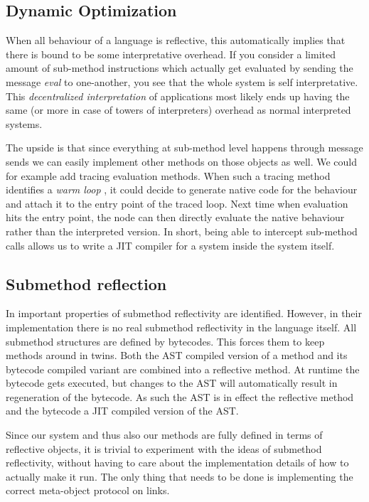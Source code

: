 \documentclass{article}
\begin{document}
\subsection{Dynamic Optimization\label{sec:dynamicoptimization}}
When all behaviour of a language is reflective, this automatically
implies that there is bound to be some interpretative overhead. If you
consider a limited amount of sub-method instructions which actually
get evaluated by sending the message \emph{eval} to one-another, you
see that the whole system is self interpretative. This
\emph{decentralized interpretation} of applications most likely ends
up having the same (or more in case of towers of interpreters)
overhead as normal interpreted systems.

The upside is that since everything at sub-method level happens
through message sends we can easily implement other methods on those
objects as well. We could for example add tracing evaluation methods.
When such a tracing method identifies a \emph{warm loop} \cite{JIT},
it could decide to generate native code for the behaviour and attach
it to the entry point of the traced loop. Next time when evaluation
hits the entry point, the node can then directly evaluate the native
behaviour rather than the interpreted version. In short, being able to
intercept sub-method calls allows us to write a JIT compiler for a
system inside the system itself.

\subsection{Submethod reflection}
In \cite{submethod reflectivity} important properties of submethod
reflectivity are identified. However, in their implementation there is
no real submethod reflectivity in the language itself. All submethod
structures are defined by bytecodes. This forces them to keep methods
around in twins. Both the AST compiled version of a method and
its bytecode compiled variant are combined into a reflective method.
At runtime the bytecode gets executed, but changes to the AST will
automatically result in regeneration of the bytecode. As such the AST
is in effect the reflective method and the bytecode a JIT compiled
version of the AST. 

Since our system and thus also our methods are fully defined in terms
of reflective objects, it is trivial to experiment with the ideas of
submethod reflectivity, without having to care about the
implementation details of how to actually make it run. The only thing
that needs to be done is implementing the correct meta-object protocol
on links.
\end{document}

